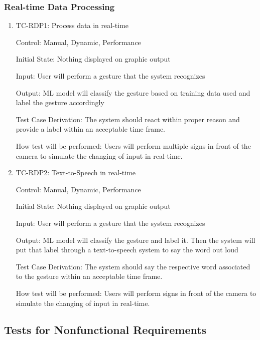\documentclass[12pt]{article}
\begin{document}
\subsubsection{Real-time Data Processing}
  
\begin{enumerate}
  
\item{TC-RDP1: Process data in real-time\\}
  
Control: Manual, Dynamic, Performance
                
Initial State: Nothing displayed on graphic output
                
Input: User will perform a gesture that the system recognizes
                
Output: ML model will classify the gesture based on training data used and label the gesture accordingly
      
Test Case Derivation: The system should react within proper reason and provide a label within an acceptable time frame.
      
How test will be performed: Users will perform multiple signs in front of the camera to simulate the changing of input in real-time.
  
\item{TC-RDP2: Text-to-Speech in real-time\\}
  
Control: Manual, Dynamic, Performance
                
Initial State: Nothing displayed on graphic output
                
Input: User will perform a gesture that the system recognizes
                
Output: ML model will classify the gesture and label it. Then the system will put that label through a text-to-speech system to say the word out loud
      
Test Case Derivation: The system should say the respective word associated to the gesture within an acceptable time frame.
      
How test will be performed: Users will perform signs in front of the camera to simulate the changing of input in real-time.
  
\end{enumerate}

\subsection{Tests for Nonfunctional Requirements}
\end{document}
